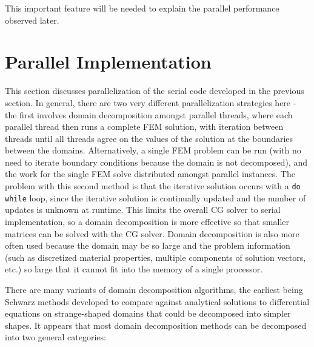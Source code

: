 \documentclass[10pt]{article}
\begin{document}
This important feature will be needed to explain the parallel performance observed later.

\section{Parallel Implementation}
This section discusses parallelization of the serial code developed in the previous section. In general, there are two very different parallelization strategies here - the first involves domain decomposition amongst parallel threads, where each parallel thread then runs a complete FEM solution, with iteration between threads until all threads agree on the values of the solution at the boundaries between the domains. Alternatively, a single FEM problem can be run (with no need to iterate boundary conditions because the domain is not decomposed), and the work for the single FEM solve distributed amongst parallel instances. The problem with this second method is that the iterative solution occurs with a {\tt do while} loop, since the iterative solution is continually updated and the number of updates is unknown at runtime. This limits the overall CG solver to serial implementation, so a domain decomposition is more effective so that smaller matrices can be solved with the CG solver. Domain decomposition is also more often used because the domain may be so large and the problem information (such as discretized material properties, multiple components of solution vectors, etc.) so large that it cannot fit into the memory of a single processor. 

There are many variants of domain decomposition algorithms, the earliest being Schwarz methods developed to compare against analytical solutions to differential equations on strange-shaped domains that could be decomposed into simpler shapes. It appears that most domain decomposition methods can be decomposed into two general categories:
\end{document}
